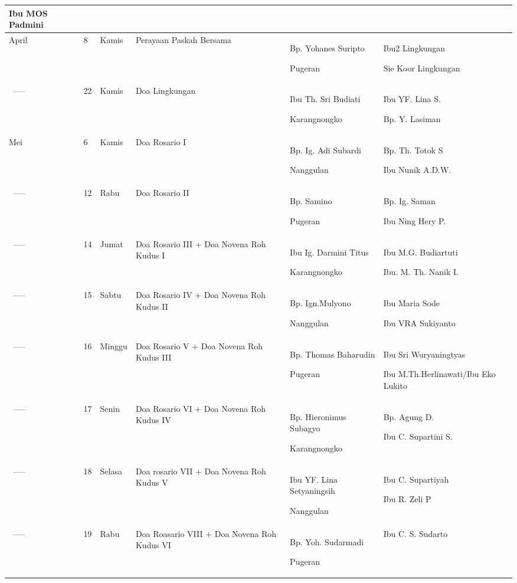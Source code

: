 \documentclass[a5paper,titlepage,11pt]{book}
\begin{document}
\begin{tabular}{|p{1.2cm}|p{0.4cm}|p{0.8cm}|p{2.5cm}|p{3cm}|p{3cm}|}
Ibu MOS Padmini\\\hline
\multicolumn{1}{|p{0.9cm}|}{April} &
8 &
Kamis &
Perayaan Paskah Bersama &
Bp. Yohanes Suripto

Pugeran &
Ibu2 Lingkungan

Sie Koor  Lingkungan\\\hline{~-----}
 &
22 &
Kamis &
Doa Lingkungan &
Ibu Th. Sri Budiati

Karangnongko &
Ibu YF. Lina S.

Bp. Y. Lasiman\\\hline
\multicolumn{1}{|p{0.9cm}|}{Mei} &
6 &
Kamis &
Doa Rosario I &
Bp. Ig. Adi Subardi

Nanggulan &
Bp. Th. Totok S

Ibu Nunik A.D.W.\\\hline{~-----}
 &
12 &
Rabu &
Doa Rosario II &
Bp. Samino

Pugeran &
Bp. Ig. Saman

Ibu Ning Hery P.\\\hline{~-----}
 &
14 &
Jumat &
Doa Rosario III + Doa Novena Roh Kudus I &
Ibu Ig. Darmini Titus

Karangnongko &
Ibu M.G. Budiartuti

Ibu. M. Th. Nanik I.\\\hline{~-----}
 &
15 &
Sabtu &
Doa Rosario IV + Doa Novena Roh Kudus II &
Bp. Ign.Mulyono

Nanggulan &
Ibu Maria Sode

Ibu VRA Sukiyanto\\\hline{~-----}
 &
16 &
Minggu &
Doa Rosario V + Doa Novena Roh Kudus III &
Bp. Thomas Baharudin

Pugeran &
Ibu Sri Wuryaningtyas

Ibu M.Th.Herlinawati/Ibu Eko Lukito\\\hline{~-----}
 &
17 &
Senin &
Doa Rosario VI + Doa Novena Roh Kudus IV &
Bp. Hieronimus Subagyo

Karangnongko &
Bp. Agung D.

Ibu C. Supartini S.\\\hline{~-----}
 &
18 &
Selasa &
Doa rosario VII + Doa Novena Roh Kudus V &
Ibu YF. Lina Setyaningsih

Nanggulan &
Ibu C. Supartiyah

Ibu R. Zeli P\\\hline{~-----}
 &
19 &
Rabu &
Doa Roasario VIII + Doa Novena Roh Kudus VI &
Bp. Yoh. Sudarmadi 

Pugeran &
Ibu C. S. Sudarto


\end{tabular}
\end{document}

